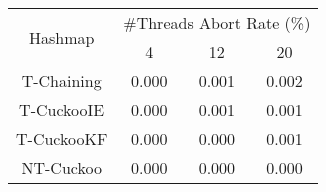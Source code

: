 \begin{tabular}{|c|c|c|c|}
\hline
\multirow{2}{*}{Hashmap} & \multicolumn{3}{c|}{\#Threads Abort Rate (\%)}\\\cline{2-4}& 4 & 12 & 20\\
\hline
\hline
T-Chaining & 0.000 & 0.001 & 0.002\\
T-CuckooIE & 0.000 & 0.001 & 0.001\\
T-CuckooKF & 0.000 & 0.000 & 0.001\\
NT-Cuckoo & 0.000 & 0.000 & 0.000\\
\hline
\end{tabular}
